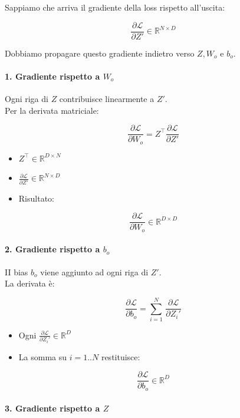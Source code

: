 \documentclass[
  11pt,
]{article}
\begin{document}
Sappiamo che arriva il gradiente della loss rispetto
all'uscita:

\[\frac{\partial\mathcal{L}}{\partial Z'} \in \mathbb{R}^{N \times D}\]

Dobbiamo propagare questo gradiente indietro verso \(Z,W_{o}\) e
\(b_{o}\).

\paragraph{1. Gradiente rispetto a $W_o$}


Ogni riga di \(Z\) contribuisce linearmente a \(Z'\).\\
Per la derivata matriciale:

\[\frac{\partial\mathcal{L}}{\partial W_{o}} = Z^{\top}\frac{\partial\mathcal{L}}{\partial Z'}\]


\begin{itemize}
\item
  \(Z^{\top} \in \mathbb{R}^{D \times N}\)
\item
  \(\frac{\partial\mathcal{L}}{\partial Z'} \in \mathbb{R}^{N \times D}\)
\item
  Risultato:
\end{itemize}


\[\frac{\partial\mathcal{L}}{\partial W_{o}} \in \mathbb{R}^{D \times D}\]


\paragraph{2. Gradiente rispetto a $b_o$}


II bias \(b_{o}\) viene aggiunto ad ogni riga di \(Z'\).\\
La derivata è:

\[\frac{\partial\mathcal{L}}{\partial b_{o}} = \sum_{i = 1}^{N}\,\frac{\partial\mathcal{L}}{\partial Z_{i}'}\]


\begin{itemize}
\item
  Ogni
  \(\frac{\partial\mathcal{L}}{\partial Z_{i}'} \in \mathbb{R}^{D}\)
\item
  La somma su \(i = 1..N\) restituisce:
\end{itemize}


\[\frac{\partial\mathcal{L}}{\partial b_{o}} \in \mathbb{R}^{D}\]


\paragraph{3. Gradiente rispetto a $Z$}
\end{document}
